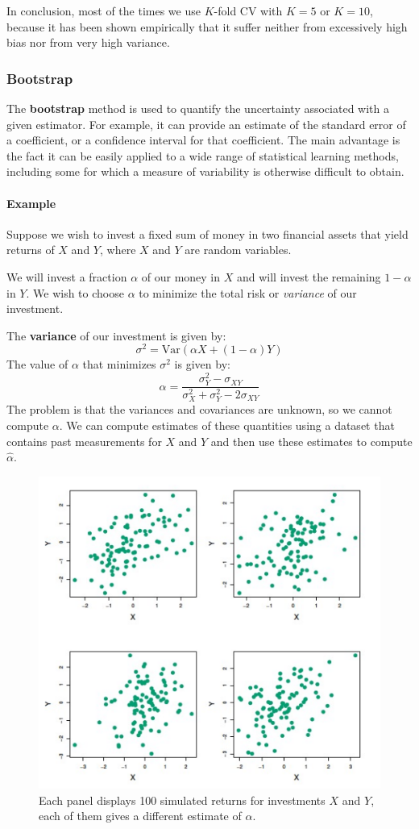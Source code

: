 In conclusion, most of the times we use $K$-fold CV with $K=5$ or $K=10$, because it has been shown empirically that it suffer neither from excessively high bias nor from very high variance.

\subsubsection*{Bootstrap}
The \textbf{bootstrap} method is used to quantify the uncertainty associated with a given estimator. For example, it can provide an estimate of the standard error of a coefficient, or a confidence interval for that coefficient. The main advantage is the fact it can be easily applied to a wide range of statistical learning methods, including some for which a measure of variability is otherwise difficult to obtain.

\paragraph*{Example}
Suppose we wish to invest a fixed sum of money in two financial assets that yield returns of $X$ and $Y$, where $X$ and $Y$ are random variables.

We will invest a fraction $\alpha$ of our money in $X$ and will invest the remaining $1-\alpha$ in $Y$. We wish to choose $\alpha$ to minimize the total risk or \textit{variance} of our investment.

The \textbf{variance} of our investment is given by:
\[
    \sigma^2 = \text{Var}(\alpha X + (1-\alpha)Y)
\]
The value of $\alpha$ that minimizes $\sigma^2$ is given by:
\[
    \alpha = \frac{\sigma^2_Y - \sigma_{XY}}{\sigma^2_X + \sigma^2_Y - 2\sigma_{XY}}
\]
The problem is that the variances and covariances are unknown, so we cannot compute $\alpha$. We can compute estimates of these quantities using a dataset that contains past measurements for $X$ and $Y$ and then use these estimates to compute $\hat{\alpha}$.

\begin{figure}[ht]
    \centering
    \includegraphics[width=0.8\linewidth]{./figures/lec_15_investment_simulations.png}
    \caption{Each panel displays 100 simulated returns for investments $X$ and $Y$, each of them gives a different estimate of $\alpha$.}
    \label{fig:lec_15_bootstrap_example}
\end{figure}

